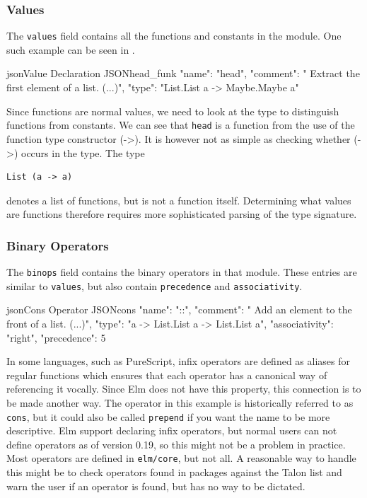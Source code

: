 \documentclass[../thesis.tex]{subfiles}
\begin{document}
\subsubsection{Values}\label{values}
The \texttt{values} field contains all the functions and constants in the module.
One such example can be seen in .
\begin{code}{json}{Value Declaration JSON}{head_funk}
{
  "name": "head",
  "comment": " Extract the first element of a list. (...)",
  "type": "List.List a -> Maybe.Maybe a"
}
\end{code}
Since functions are normal values, we need to look at the type to distinguish functions from constants.
We can see that \texttt{head} is a function from the use of the function type constructor (->).
It is however not as simple as checking whether (->) occurs in the type.
The type
\begin{verbatim}
List (a -> a)
\end{verbatim}
denotes a list of functions, but is not a function itself.
Determining what values are functions therefore requires more sophisticated parsing of the type signature.

\subsubsection{Binary Operators}\label{binary_operators}
The \texttt{binops} field contains the binary operators in that module.
These entries are similar to \texttt{values}, but also contain \texttt{precedence} and \texttt{associativity}.
\begin{code}{json}{Cons Operator JSON}{cons}
{
  "name": "::",
  "comment": " Add an element to the front of a list. (...)",
  "type": "a -> List.List a -> List.List a",
  "associativity": "right",
  "precedence": 5
}
\end{code}
In some languages, such as PureScript, infix operators are defined as aliases
for regular functions which ensures that each operator has a canonical way of referencing it vocally.
Since Elm does not have this property, this connection is to be made another way.
The operator in this example is historically referred to as \texttt{cons}, but it could also be called
\texttt{prepend} if you want the name to be more descriptive.
Elm support declaring infix operators, but normal users can not define operators as of version 0.19, so this might not be a problem in practice.
Most operators are defined in \texttt{elm/core}, but not all.%
A reasonable way to handle this might be to check operators found in packages against the Talon list
and warn the user if an operator is found, but has no way to be dictated.
\end{document}
